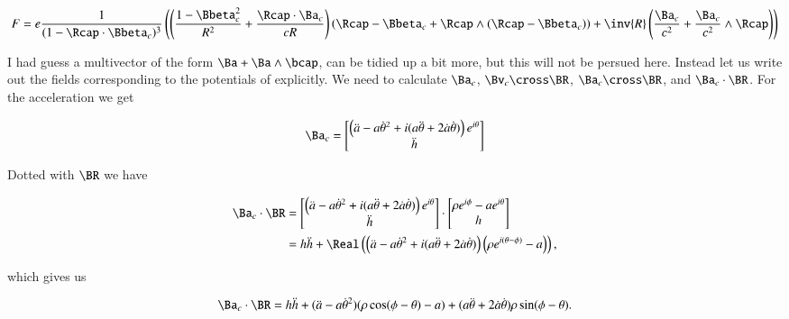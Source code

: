 {\begin{equation}\label{eqn:relativisticElectrodynamicsExamReflection:935}
F =
e \frac{1}{(1 - \Rcap \cdot \Bbeta_c)^3}
\left(
\left(
\frac{1 - \Bbeta_c^2}{R^2} + \frac{\Rcap \cdot \Ba_c}{c R}
\right)
\left(
\Rcap - \Bbeta_c + \Rcap \wedge (\Rcap - \Bbeta_c)
\right)
+ \inv{R} \left(
\frac{\Ba_c}{c^2}
+ \frac{\Ba_c}{c^2} \wedge \Rcap
\right)
\right)
\end{equation}

I had guess a multivector of the form \(\Ba + \Ba \wedge \bcap\), can be tidied up a bit more, but this will not be persued here.  Instead let us write out the fields corresponding to the potentials of  explicitly.  We need to calculate \(\Ba_c\), \(\Bv_c \cross \BR\), \(\Ba_c \cross \BR\), and \(\Ba_c \cdot \BR\).  For the acceleration we get

\begin{equation}\label{eqn:relativisticElectrodynamicsExamReflection:940}
\Ba_c =
\begin{bmatrix}
\left( \ddot{a} - a {\dot{\theta}}^2 + i ( a\ddot{\theta} + 2 \dot{a} \dot{\theta} ) \right) e^{i\theta} \\
\ddot{h}
\end{bmatrix}
\end{equation}

Dotted with \(\BR\) we have

\begin{equation}\label{eqn:relativisticElectrodynamicsExamReflection:1290}
\begin{aligned}
\Ba_c \cdot \BR
&=
\begin{bmatrix}
\left( \ddot{a} - a {\dot{\theta}}^2 + i ( a\ddot{\theta} + 2 \dot{a} \dot{\theta} ) \right) e^{i\theta} \\
\ddot{h}
\end{bmatrix}
\cdot
\begin{bmatrix}
\rho e^{i\phi} - a e^{i\theta} \\
h
\end{bmatrix} \\
&=
h \ddot{h} + \Real\left(
\left( \ddot{a} - a {\dot{\theta}}^2 + i ( a\ddot{\theta} + 2 \dot{a} \dot{\theta} ) \right) \left(\rho e^{i(\theta- \phi)} - a\right)
\right) ,
\end{aligned}
\end{equation}

which gives us

\begin{equation}\label{eqn:relativisticElectrodynamicsExamReflection:950}
\Ba_c \cdot \BR =
h \ddot{h} +
( \ddot{a} - a {\dot{\theta}}^2 ) (\rho \cos(\phi - \theta) - a)
+ (a \ddot{\theta} + 2 \dot{a} \dot{\theta}) \rho \sin(\phi - \theta).
\end{equation}

}
